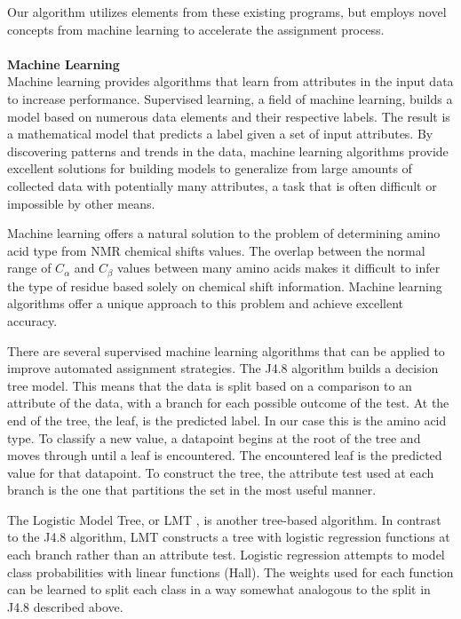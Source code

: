 \documentclass{article}
\begin{document}
Our algorithm utilizes elements from these existing programs, but employs novel concepts from machine learning to accelerate the assignment process.
\\\\
\noindent\textbf{Machine Learning}\\
Machine learning provides algorithms that learn from attributes in the input data to increase performance. Supervised learning, a field of machine learning, builds a model based on numerous data elements and their respective labels. The result is a mathematical model that predicts a label given a set of input attributes. By discovering patterns and trends in the data, machine learning algorithms provide excellent solutions for building models to generalize from large amounts of collected data with potentially many attributes, a task that is often difficult or impossible by other means.

Machine learning offers a natural solution to the problem of determining amino acid type from NMR chemical shifts values. The overlap between the normal range of $C_\alpha$ and $C_\beta$ values between many amino acids makes it difficult to infer the type of residue based solely on chemical shift information. Machine learning algorithms offer a unique approach to this problem and achieve excellent accuracy.

There are several supervised machine learning algorithms that can be applied to improve automated assignment strategies. The J4.8 algorithm \cite{j48_algorithm} builds a decision tree model. This means that the data is split based on a comparison to an attribute of the data, with a branch for each possible outcome of the test. At the end of the tree, the leaf, is the predicted label. In our case this is the amino acid type. To classify a new value, a datapoint begins at the root of the tree and moves through until a leaf is encountered. The encountered leaf is the predicted value for that datapoint. To construct the tree, the attribute test used at each branch is the one that partitions the set in the most useful manner.

The Logistic Model Tree, or LMT \cite{lmt_algorithm}, is another tree-based algorithm. In contrast to the J4.8 algorithm, LMT constructs a tree with logistic regression functions at each branch rather than an attribute test. Logistic regression attempts to model class probabilities with linear functions (Hall). The weights used for each function can be learned to split each class in a way somewhat analogous to the split in J4.8 described above.
\end{document}
